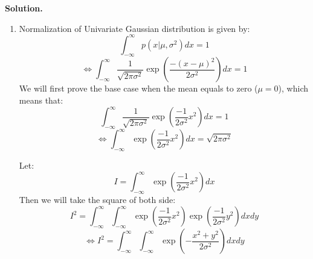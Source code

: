 \documentclass[a4paper, 10pt]{article}  %
\begin{document}
\textbf{Solution.}
\begin{enumerate}[label=\textbf{(\alph*)}]
    \item Normalization of Univariate Gaussian distribution is given by:
    \[\int_{-\infty}^{\infty} p(x | \mu, \sigma^2) dx = 1\]
    \[\Longleftrightarrow \int_{-\infty}^{\infty} \frac{1}{\sqrt{2 \pi \sigma^2}} \exp \left( \frac{-(x - \mu)^2}{2 \sigma^2} \right) dx = 1\]
    We will first prove the base case when the mean equals to zero ($\mu = 0$), which means that:
    \[\int_{-\infty}^{\infty} \frac{1}{\sqrt{2 \pi \sigma^2}} \exp \left( \frac{-1}{2 \sigma^2} x^2 \right) dx = 1\]
     \[\Longleftrightarrow \int_{-\infty}^{\infty} \exp \left( \frac{-1}{2 \sigma^2} x^2 \right) dx = \sqrt{2 \pi \sigma^2}\]
     
     Let:
     \[I = \int_{-\infty}^{\infty} \exp \left( \frac{-1}{2 \sigma^2} x^2 \right) dx\]
     Then we will take the square of both side:
     \[I^2 = \int_{-\infty}^{\infty} \int_{-\infty}^{\infty} 
     \exp \left( \frac{-1}{2 \sigma^2} x^2 \right) \exp \left( \frac{-1}{2 \sigma^2} y^2 \right) dx dy\]
     \[\Longleftrightarrow I^2 = \int_{-\infty}^{\infty} \int_{-\infty}^{\infty}
     \exp \left( -\frac{x^2 + y^2}{2 \sigma^2}\right) dx dy\]
     

\end{enumerate}
\end{document}
